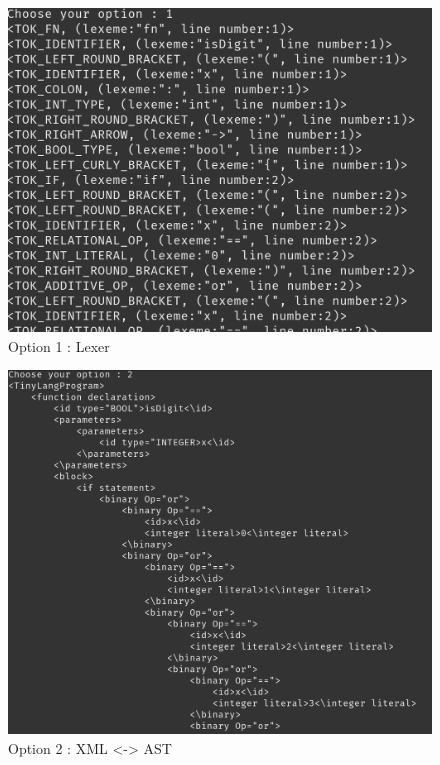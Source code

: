 \begin{itemize}
        \begin{figure}[H]
            \centering
           \includegraphics[scale=0.5]{Introduction/images/option1menu.png}
            \caption{Option 1 : Lexer}
            \label{fig:option1 lexer}
        \end{figure}

        \begin{figure}[H]
            \centering
           \includegraphics[scale=0.5]{Introduction/images/option2menu.png}
            \caption{Option 2 : XML <-> AST}
            \label{fig:option2 xml}
        \end{figure}    
  

\end{itemize}
